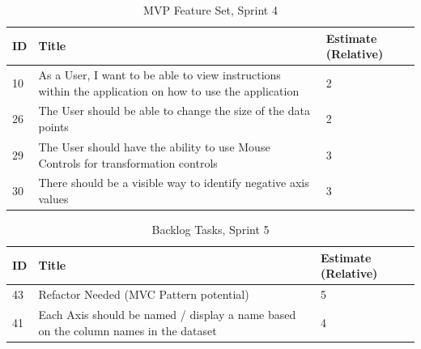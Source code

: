 \begin{table}[h]
    \begin{tabularx}{\textwidth}{ | X | X | X | }
        \hline
        ID & Title                                                                                                  & Estimate (Relative) \\
        \hline
        10 & As a User, I want to be able to view instructions within the application on how to use the application & 2                   \\
        \hline
        26 & The User should be able to change the size of the data points                                          & 2                   \\
        \hline
        29 & The User should have the ability to use Mouse Controls for transformation controls                     & 3                   \\
        \hline
        30 & There should be a visible way to identify negative axis values                                         & 3                   \\
        \hline
    \end{tabularx}
    \caption{MVP Feature Set, Sprint 4}
    \label{sprint4}
\end{table}

\begin{table}[hbt!]
    \begin{tabularx}{\textwidth}{ | X | X | X | }
        \hline
        ID & Title                                                                               & Estimate (Relative) \\
        \hline
        43 & Refactor Needed (MVC Pattern potential)                                             & 5                   \\
        \hline
        41 & Each Axis should be named / display a name based on the column names in the dataset & 4                   \\
        \hline
    \end{tabularx}
    \caption{Backlog Tasks, Sprint 5}
    \label{sprint5}
\end{table}

